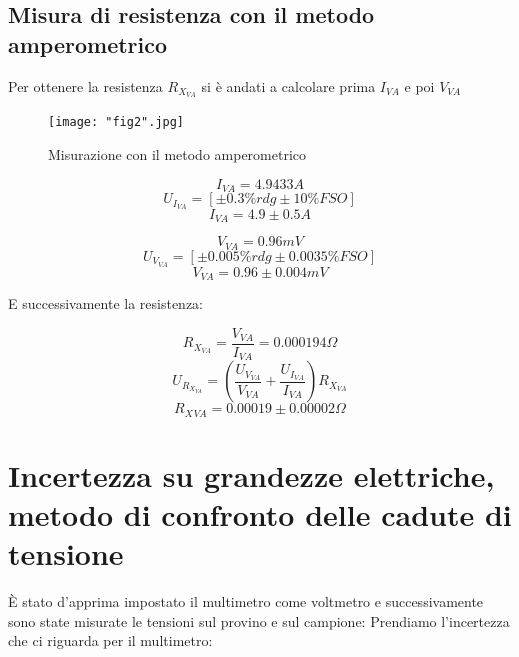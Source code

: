 \documentclass[a4paper]{article}
\begin{document}
\subsection{Misura di resistenza con il metodo amperometrico}
Per ottenere la resistenza $R_{X_{VA}}$ si è andati a calcolare prima $I_{VA}$ e poi $V_{VA}$
\begin{figure}[htp]
	\centering
	\texttt{[image: "fig2".jpg]}
	\caption{Misurazione  con il metodo amperometrico}
	\label{}
\end{figure}
\begin{Large}
	\begin{equation}
		I_{VA}= 4.9433 A
	\end{equation}
	\begin{equation}
		U_{I_{VA}} = [\pm 0.3\%rdg \pm 10\% FSO]
	 \end{equation}
	 \begin{equation}
		I_{VA} = 4.9 \pm 0.5 A
	 \end{equation}
\end{Large}

\begin{Large}
	\begin{equation}
		V_{VA}= 0.96 mV
	\end{equation}
	\begin{equation}
		U_{V_{VA}} = [\pm 0.005\%rdg \pm 0.0035\% FSO]
	 \end{equation}
	 \begin{equation}
		V_{VA} = 0.96 \pm 0.004 mV
	 \end{equation}
\end{Large}
E successivamente la resistenza:
\begin{Large}
	\begin{equation}
		R_{X_{VA}}= \frac{V_{VA}}{I_{VA}} =0.000194 \Omega
	\end{equation}
	\begin{equation}
		U_{R_{X_{VA}}} = (\frac{U_{V_{VA}}}{V_{VA}}+\frac{U_{I_{VA}}}{I_{VA}})R_{X_{VA}}
	 \end{equation}
	 \begin{equation}
		R_X{_{VA}} = 0.00019\pm 0.00002\Omega
	 \end{equation}
\end{Large}

\section {Incertezza su grandezze elettriche, metodo di confronto delle cadute di tensione}
È stato d'apprima impostato il multimetro come voltmetro e successivamente sono state misurate le tensioni sul provino e sul campione:
Prendiamo l'incertezza che ci riguarda per il multimetro:
\end{document}
